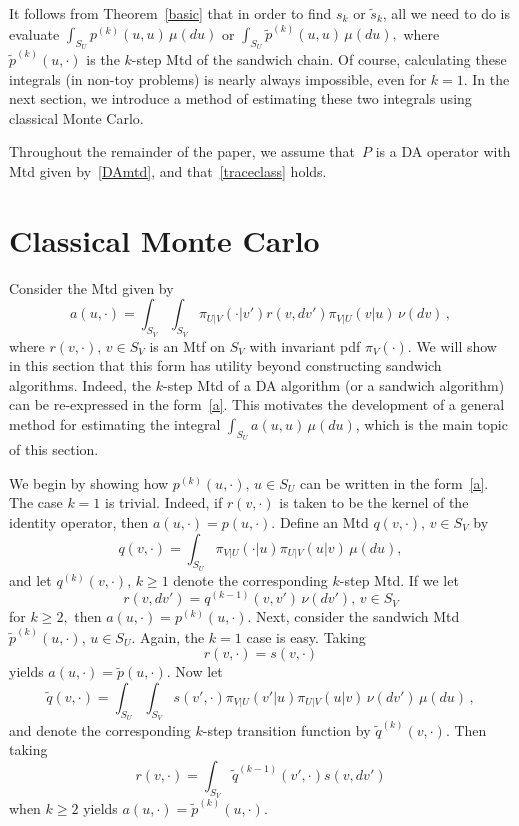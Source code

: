 \documentclass[11pt]{article}
\begin{document}
	It follows from Theorem~\ref{basic} that in order to find
        $s_k$ or $\tilde{s}_k$, all we need to do is evaluate
        $\int_{S_U} p^{(k)}(u,u) \,\mu(du)$ or $\int_{S_U}
        \tilde{p}^{(k)}(u,u) \,\mu(du),$ where
        $\tilde{p}^{(k)}(u,\cdot)$ is the $k$-step Mtd of the sandwich
        chain.  Of course, calculating these integrals (in non-toy
        problems) is nearly always impossible, even for $k=1$.  In the
        next section, we introduce a method of estimating these two
        integrals using classical Monte Carlo.
	
	Throughout the remainder of the paper, we assume that~$P$ is a
        DA operator with Mtd given by~\eqref{DAmtd}, and
        that~\eqref{traceclass} holds.

	\section{Classical Monte Carlo} \label{MC}
	Consider the Mtd given by
	\begin{equation} \label{a} a(u, \cdot) = \int_{S_V}\int_{S_V}
          \pi_{U|V}(\cdot|v') r(v,dv') \pi_{V|U}(v|u) \, \nu(dv) \,,
	\end{equation}
	where $r(v,\cdot), \, v \in S_V$ is an Mtf on $S_V$ with
        invariant pdf $\pi_V(\cdot).$ We will show in this section
        that this form has utility beyond constructing sandwich
        algorithms.  Indeed, the $k$-step Mtd of a DA algorithm (or a
        sandwich algorithm) can be re-expressed in the
        form~\eqref{a}. This motivates the development of a general
        method for estimating the integral $\int_{S_U} a(u,u) \,
        \mu(du)$, which is the main topic of this section.
	
	We begin by showing how $p^{(k)}(u,\cdot), \, u \in S_U$ can
        be written in the form~\eqref{a}.  The case $k=1$ is trivial.
        Indeed, if $r(v,\cdot)$ is taken to be the kernel of the
        identity operator, then $a(u,\cdot) = p(u,\cdot)$.  Define an
        Mtd $q(v,\cdot), \, v\in S_V$ by
	\[
	q(v,\cdot) = \int_{S_U} \pi_{V|U}(\cdot|u) \pi_{U|V}(u|v) \, \mu(du),
	\]
	and let $q^{(k)}(v,\cdot), \, k \geq 1$ denote the
        corresponding $k$-step Mtd. If we let
	\[
	r(v,dv')= q^{(k-1)}(v,v') \, \nu(dv'), \, v \in S_V
	\]
	for $k \geq 2,$ then $a(u,\cdot) = p^{(k)}(u,\cdot)$. Next,
        consider the sandwich Mtd $\tilde{p}^{(k)}(u,\cdot), \, u \in
        S_U$.  Again, the $k=1$ case is easy.  Taking
	\[
	r(v,\cdot) = s(v,\cdot)
	\]
	yields $a(u,\cdot) = \tilde{p}(u,\cdot)$.  Now let
	\[
	\tilde{q}(v,\cdot) = \int_{S_U} \int_{S_V} s(v',\cdot)
        \pi_{V|U}(v'|u) \pi_{U|V}(u|v)\, \nu(dv')\, \mu(du) \,,
	\]
	and denote the corresponding $k$-step transition function by
        $\tilde{q}^{(k)}(v,\cdot)$.  Then taking
	\[
	r(v,\cdot) = \int_{S_V} \tilde{q}^{(k-1)}(v',\cdot) s(v,dv')
	\]
	when $k \geq 2$ yields $a(u,\cdot) = \tilde{p}^{(k)}(u,\cdot).$
	
\end{document}
